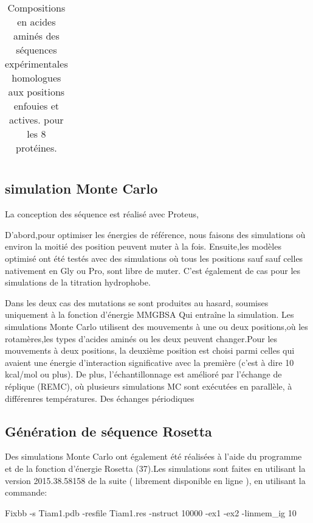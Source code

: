 \begin{enumarete}
\begin{table}[!htbp]
\begin{tabular}{ccccccccc}
        \bottomrule


      \end{tabular}      
      \caption{Compositions en acides aminés des séquences expérimentales homologues aux positions enfouies et actives. pour les 8 protéines.}
\label{tab:freq_AA_ALL}      
    \end{table}


\subsection{simulation Monte Carlo}    

La conception des séquence est réalisé avec Proteus,

D'abord,pour optimiser les énergies de référence, nous faisons des simulations où environ la moitié des position peuvent muter à la fois.
Ensuite,les modèles optimisé ont été testés avec des simulations où tous les positions sauf sauf celles nativement en Gly ou Pro, sont libre de muter. C'est également de cas pour les simulations de la titration hydrophobe.

Dans les deux cas des mutations se sont produites au hasard, soumises uniquement à la fonction d'énergie MMGBSA
Qui entraîne la simulation. Les simulations Monte Carlo utilisent des mouvements à une ou deux positions,où les rotamères,les types d'acides aminés ou les deux peuvent changer.Pour les mouvements à deux positions, la deuxième position est choisi parmi celles qui avaient une énergie d'interaction significative avec la première (c'est à dire 10 kcal/mol ou plus). De plus, l'échantillonnage est amélioré par l'échange de réplique (REMC), où plusieurs simulations MC sont exécutées en parallèle, à différenres températures. Des échanges périodiques



\subsection{Génération de séquence Rosetta}


Des simulations Monte Carlo ont également été réalisées à l'aide du programme et de la fonction d'énergie Rosetta (37).Les simulations sont faites en utilisant la version 2015.38.58158 de la suite ( librement disponible en ligne ), en utilisant la commande:

Fixbb -s Tiam1.pdb -resfile Tiam1.res -nstruct 10000 -ex1 -ex2 -linmem\_ig 10


\end{enumarete}
